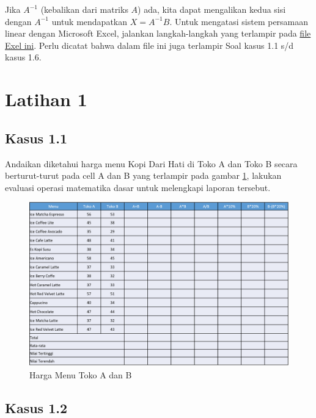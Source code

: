 \documentclass[
]{book}
\begin{document}
Jika \(A^{-1}\) (kebalikan dari matriks \(A\)) ada, kita dapat mengalikan kedua sisi dengan \(A^{-1}\) untuk mendapatkan \(X = A^{-1}B\). Untuk mengatasi sistem persamaan linear dengan Microsoft Excel, jalankan langkah-langkah yang terlampir pada \href{https://github.com/Bakti-Siregar/Matematika-Bisnis/raw/master/data/dasar-matematika-bisnis.xlsx}{file Exel ini}. Perlu dicatat bahwa dalam file ini juga terlampir Soal kasus 1.1 s/d kasus 1.6.

\hypertarget{latihan-1}{%
\section{Latihan 1}\label{latihan-1}}

\hypertarget{kasus-1.1}{%
\subsection*{Kasus 1.1}\label{kasus-1.1}}

Andaikan diketahui harga menu Kopi Dari Hati di Toko A dan Toko B secara berturut-turut pada cell A dan B yang terlampir pada gambar \ref{fig:tabel1}, lakukan evaluasi operasi matematika dasar untuk melengkapi laporan tersebut.

\begin{figure}

{\centering \includegraphics[width=1\linewidth]{images/tabel1} 

}

\caption{Harga Menu Toko A dan B}\label{fig:tabel1}
\end{figure}

\hypertarget{kasus-1.2}{%
\subsection*{Kasus 1.2}\label{kasus-1.2}}
\end{document}
